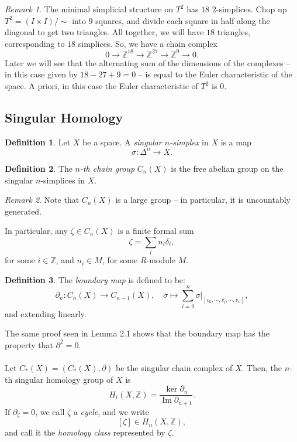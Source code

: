 \documentclass[a4paper]{report}
\theoremstyle{definition}
\newtheorem{definition}{Definition}
\theoremstyle{remark}
\newtheorem{remark}{Remark}
\theoremstyle{proposition}
\theoremstyle{conjecture}
\theoremstyle{lemma}
\theoremstyle{corollary}
\theoremstyle{exercise}
\newcommand{\on}{\operatorname}
\begin{document}
\begin{remark}
    The minimal simplicial structure on $T^2$ has $18$ $2$-simplices.
    Chop up $T^2 = (I \times I)/\sim$ into $9$ squares, and divide each square 
    in half along the diagonal to get two triangles. All together, we will have $18$
    triangles, corresponding to $18$ simplices.
    So, we have a chain complex 
    $$0 \longrightarrow \mathbb{Z}^{18} \longrightarrow \mathbb{Z}^{27} \longrightarrow \mathbb{Z}^{9} \longrightarrow 0.$$
    Later we will see that the alternating sum of the dimensions of the complexes -- 
    in this case given by $18 - 27 + 9 = 0$ -- is equal to the Euler characteristic of the space.
    A priori, in this case the Euler characteristic of $T^2$ is $0$.
\end{remark}

\subsection{Singular Homology}

\begin{definition}
    Let $X$ be a space. A \emph{singular $n$-simplex} in $X$ is a map 
    $$\sigma : \Delta^n \longrightarrow X.$$
\end{definition}

\begin{definition}
    The \emph{$n$-th chain group} $C_n(X)$ is the free abelian group on the singular $n$-simplices 
    in $X$. 
    \begin{remark}
        Note that $C_n(X)$ is a large group -- in particular, it is uncountably generated.
    \end{remark}
    In particular, any $\zeta \in C_n(X)$ is a finite formal sum $$\zeta = \sum_i n_i\delta_i,$$
    for some $i \in \mathbb{Z}$, and $n_i \in M$, for some $R$-module $M$.
\end{definition}

\begin{definition}
    The \emph{boundary map} is defined to be: 
    $$\partial_n : C_n(X) \longrightarrow C_{n-1}(X),\quad \sigma \longmapsto \sum_{i=0}^n \sigma\vert_{[v_0,\cdots, \widehat{v_i},\cdots,v_n]},$$
    and extending linearly.
\end{definition}

The same proof seen in Lemma 2.1 shows that the boundary map has the property that $\partial^2 = 0$.\\\\
Let $C_\ast(X) = (C_\ast(X), \partial)$ be the singular chain complex of $X$. 
Then, the $n$-th singular homology group of $X$ is $$H_i(X,\mathbb{Z}) = \frac{\ker \partial_n}{\on{Im} \partial_{n+1}}.$$
If $\partial_\zeta = 0$, we call $\zeta$ a \emph{cycle}, and we write 
$$[\zeta] \in H_n(X,\mathbb{Z}),$$
and call it the \emph{homology class} represented by $\zeta$.
\end{document}
